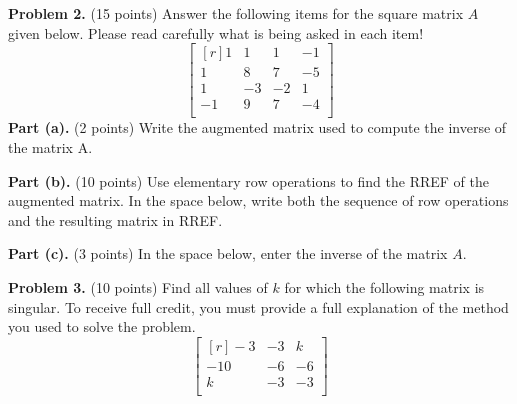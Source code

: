 \documentclass[12pt]{article}
\begin{document}
\clearpage


\textbf{Problem 2.} (15 points) Answer the following items for the square matrix $A$ given below. Please read carefully what is being asked in each item!
\[
\begin{bmatrix*}[r]1&1&1&-1\\1&8&7&-5\\1&-3&-2&1\\-1&9&7&-4\\\end{bmatrix*}
\]
\textbf{Part (a).} (2 points) Write the augmented matrix used to compute the inverse of the matrix A.

\vskip1.5in

\textbf{Part (b).} (10 points) Use elementary row operations to find the RREF of the augmented matrix.
In the space below, write both the sequence of row operations and the resulting matrix in RREF.

\vskip3.5in

\textbf{Part (c).} (3 points) In the space below, enter the inverse of the matrix $A$.

\clearpage

\textbf{Problem 3.} (10 points) Find all values of $k$ for which the following matrix is singular. To receive full credit, you must provide a full explanation of the method you used to solve the problem.
\[
\begin{bmatrix*}[r]-3&-3&k\\-10&-6&-6\\k&-3&-3\\\end{bmatrix*}
\]

\clearpage
\end{document}
